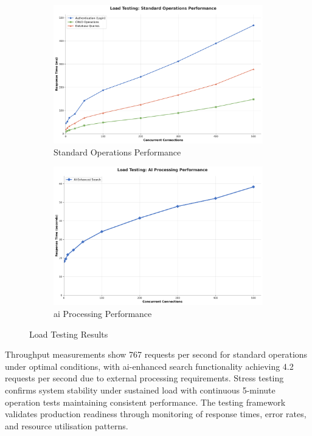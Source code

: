\begin{figure}[htbp]
    \centering
    \begin{subfigure}[t]{0.48\textwidth}
        \centering
        \includegraphics[width=\textwidth]{figs/chapter5/load_testing_standard.png}
        \caption{Standard Operations Performance}
        \label{fig:load_testing_standard}
    \end{subfigure}
    \hfill
    \begin{subfigure}[t]{0.48\textwidth}
        \centering
        \includegraphics[width=\textwidth]{figs/chapter5/load_testing_ai.png}
        \caption{\acs{ai} Processing Performance}
        \label{fig:load_testing_ai}
    \end{subfigure}
    \caption{Load Testing Results}
    \label{fig:load_testing_results}
\end{figure}

Throughput measurements show 767 requests per second for standard operations under optimal conditions, with \ac{ai}-enhanced search functionality achieving 4.2 requests per second due to external processing requirements. Stress testing confirms system stability under sustained load with continuous 5-minute operation tests maintaining consistent performance. The testing framework validates production readiness through monitoring of response times, error rates, and resource utilisation patterns.

